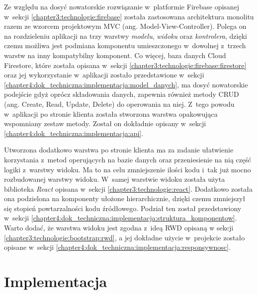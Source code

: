 \documentclass[../Kamil_Kowalewski_Main.tex]{subfiles}
\begin{document}
{{        Ze względu na dosyć nowatorskie rozwiązanie w~platformie Firebase opisanej
        w~sekcji \ref{chapter3:technologie:firebase} została zastosowana architektura
        monolitu razem ze wzorcem projektowym MVC (ang. Model-View-Controller). Polega
        on na rozdzieleniu aplikacji na trzy warstwy \textit{modelu}, \textit{widoku}
        oraz \textit{kontrolera}, dzięki czemu możliwa jest podmiana komponentu
        umieszczonego w~dowolnej z~trzech warstw na inny kompatybilny komponent. Co
        więcej, baza danych Cloud Firestore, które została opisana w~sekcji
        \ref{chapter3:technologie:firebase:firestore} oraz jej wykorzystanie
        w~aplikacji zostało przedstawione w~sekcji
        \ref{chapter4:dok_techniczna:implementacja:model_danych}, ma dosyć nowatorskie
        podejście gdyż oprócz składowania danych, zapewnia również metody
        CRUD (ang. Create, Read, Update, Delete) do operowania na niej. Z~tego powodu
        w~aplikacji po stronie klienta została stworzona warstwa opakowująca wspomniany
        zestaw metody. Został on dokładnie opisany w~sekcji
        \ref{chapter4:dok_techniczna:implementacja:api}.

        Utworzona dodatkowo warstwa po stronie klienta ma za zadanie ułatwienie
        korzystania z~metod operujących na bazie danych oraz przeniesienie na nią
        część logiki z~warstwy widoku. Ma to na celu zmniejszenie ilości kodu i~tak już
        mocno rozbudowanej warstwy widoku. W~samej warstwie widoku została użyta
        biblioteka \textit{React} opisana w~sekcji \ref{chapter3:technologie:react}.
        Dodatkowo została ona podzielona na komponenty ułożone hierarchicznie, dzięki
        czemu zmniejszył się stopień powtarzalności kodu źródłowego. Podział ten został
        przedstawiony w~sekcji
        \ref{chapter4:dok_techniczna:implementacja:struktura_komponentow}. Warto dodać,
        że warstwa widoku jest zgodna z~ideą RWD opisaną w sekcji
        \ref{chapter3:technologie:bootstrap:rwd}, a jej dokładne użycie w~projekcie
        zostało opisane w~sekcji
        \ref{chapter4:dok_techniczna:implementacja:responsywnosc}.
    }

    \section{Implementacja}
    \label{chapter4:dok_techniczna:implementacja} {

}}
\end{document}
